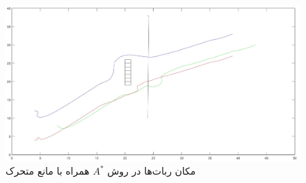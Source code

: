 \begin{figure}[!h]
	\centering
	\includegraphics[scale=0.2]{Images/dynamic-A-star.jpg}
	\caption{مکان ربات‌ها در روش $A^*$ همراه با مانع متحرک}
\end{figure}







